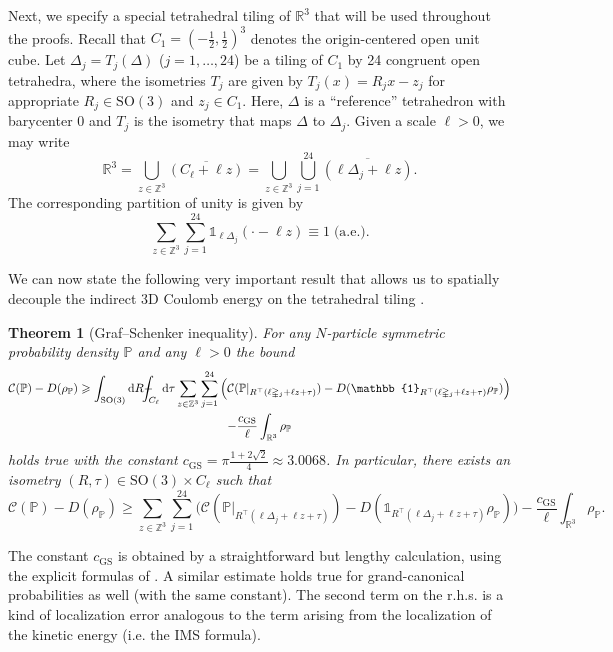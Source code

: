 \documentclass[final,onefignum,onetabnum,reqno]{amsart}
\newtheorem{theorem}{Theorem}[section]
\theoremstyle{remark}
\renewcommand{\ge}{\geqslant}
\newcommand{\ol}[1]{\overline{#1}}
\newcommand{\RR}{\mathbb{R}}
\newcommand{\ZZ}{\mathbb{Z}}
\newcommand{\PP}{\mathbb{P}}
\newcommand{\SO}{\mathrm{SO}}
\newcommand{\GS}{\mathrm{GS}} %
\newcommand{\iden}{\mathbb{1}} %
\newcommand{\tetra}{\mathbb{\Delta}} %
\newcommand{\dd}{\mathrm{d}} %
\def\Xint#1{\mathchoice
{\XXint\displaystyle\textstyle{#1}}%
{\XXint\textstyle\scriptstyle{#1}}%
{\XXint\scriptstyle\scriptscriptstyle{#1}}%
{\XXint\scriptscriptstyle\scriptscriptstyle{#1}}%
\!\int}
\def\XXint#1#2#3{{\setbox0=\hbox{$#1{#2#3}{\int}$ }
\vcenter{\hbox{$#2#3$ }}\kern-.6\wd0}}
\def\dashint{\Xint-}
\newcommand{\Cc}{\mathcal{C}}
\begin{document}
Next, we specify a special tetrahedral tiling of $\RR^3$ that will be used throughout the proofs. Recall that $C_1=(-\frac{1}{2},\frac{1}{2})^3$ denotes the origin-centered open unit cube. Let $\tetra_j=T_j(\tetra)$ ($j=1,\ldots,24$) be a tiling of $C_1$ by 24 congruent open tetrahedra, where
the isometries $T_j$ are given by $T_j(x)=R_jx-z_j$ for appropriate $R_j\in \SO(3)$ and $z_j\in C_1$. Here, $\tetra$ is a ``reference'' tetrahedron with barycenter 0 and $T_j$ is the isometry that maps $\tetra$ to $\tetra_j$. 
Given a scale $\ell>0$, we may write 
$$
\RR^3=\bigcup_{z\in\ZZ^3}\ol{(C_\ell+\ell z)}=\bigcup_{z\in\ZZ^3} \bigcup_{j=1}^{24} \ol{( \ell \tetra_j + \ell z)}.
$$
The corresponding partition of unity is given by 
\begin{equation}\label{pouind}
\sum_{z\in\ZZ^3} \sum_{j=1}^{24} \iden_{\ell \tetra_j}(\cdot-\ell z)\equiv 1\;\text{(a.e.)}.
\end{equation}

We can now state the following very important result that allows us to spatially decouple the indirect 3D Coulomb energy on the tetrahedral tiling \cite{graf1995electrostatic,graf1995molecular,lewin2018statistical}.

\begin{theorem}[Graf--Schenker inequality]\label{gsineq}
For any $N$-particle symmetric probability density $\PP$ and any $\ell>0$ the bound 
\begin{multline*}
\Cc(\PP)-D(\rho_\PP)\ge \int_{\SO(3)}\dd R \dashint_{C_\ell}\dd\tau \sum_{z\in\ZZ^3}\sum_{j=1}^{24} 
\Big( \Cc(\PP|_{R^\top(\ell\tetra_j + \ell z + \tau)}) - D(\iden_{R^\top(\ell\tetra_j + \ell z + \tau)}\rho_{\PP}) \Big) \\
- \frac{c_\GS}{\ell} \int_{\RR^3} \rho_\PP
\end{multline*}
holds true with the constant 
$c_{\GS}=\pi\frac{1+2\sqrt{2}}{4}\approx 3.0068$. In particular, there exists an isometry $(R,\tau)\in \SO(3)\times C_\ell$ such that
\begin{equation}\label{gsmv}
\Cc(\PP)-D(\rho_\PP)\ge \sum_{z\in\ZZ^3}\sum_{j=1}^{24} 
\Big( \Cc(\PP|_{R^\top(\ell\tetra_j + \ell z + \tau)}) - D(\iden_{R^\top(\ell\tetra_j + \ell z + \tau)}\rho_{\PP}) \Big) 
- \frac{c_\GS}{\ell} \int_{\RR^3} \rho_\PP.
\end{equation}
\end{theorem}
The constant $c_\GS$ is obtained by a straightforward but lengthy calculation, using the explicit formulas of \cite{graf1995electrostatic,graf1995molecular}. 
A similar estimate holds true for grand-canonical probabilities as well (with the same constant). The second term on the r.h.s. is a kind of localization error analogous to the term arising from the localization of the kinetic energy (i.e. the IMS formula). 
\end{document}
